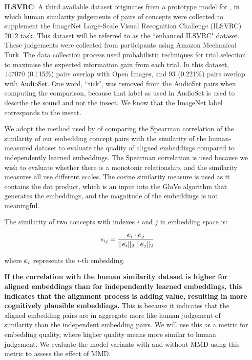 \textbf{ILSVRC}: A third available dataset originates from a prototype model for \cite{RoadsLoveCVPR}, in which human similarity judgements of pairs of concepts were collected to supplement the ImageNet Large-Scale Visual Recognition Challenge (ILSVRC) 2012 task. This dataset will be referred to as the ``enhanced ILSVRC" dataset. These judgements were collected from participants using Amazon Mechanical Turk. The data collection process used probabilistic techniques for trial selection to maximise the expected information gain from each trial. In this dataset, 147070 (0.115\%) pairs overlap with Open Images, and 93 (0.221\%) pairs overlap with AudioSet. One word, ``tick", was removed from the AudioSet pairs when computing the comparison, because that label as used in AudioSet is used to describe the sound and not the insect. We know that the ImageNet label corresponds to the insect. 

We adopt the method used by \cite{mturk771} of comparing the Spearman correlation of the similarity of our embedding concept pairs with the similarity of the human-measured dataset to evaluate the quality of aligned embeddings compared to independently learned embeddings. The Spearman correlation is used because we wish to evaluate whether there is a monotonic relationship, and the similarity measures all use different scales. The cosine similarity measure is used as it contains the dot product, which is an input into the GloVe algorithm that generates the embeddings, and the magnitude of the embeddings is not meaningful. 

The similarity of two concepts with indexes $i$ and $j$ in embedding space is:

\begin{equation*}
s_{ij} = \frac{\boldsymbol{e}_i \cdot \boldsymbol{e}_j}{||\boldsymbol{e}_i||_2 \medspace ||\boldsymbol{e}_j||_2}
\end{equation*}

where $\boldsymbol{e}_i$ represents the $i$-th embedding.

\textbf{If the correlation with the human similarity dataset is higher for aligned embeddings than for independently learned embeddings, this indicates that the alignment process is adding value, resulting in more cognitively plausible embeddings.} This is because it indicates that the aligned embedding pairs are in aggregate more like human judgement of similarity than the independent embedding pairs. We will use this as a metric for embedding quality, where higher quality means more similar to human judgement.  We evaluate the model variants with and without MMD using this metric to assess the effect of MMD. 

